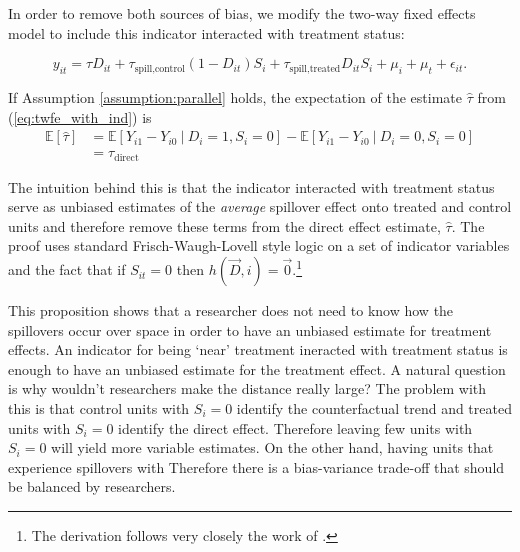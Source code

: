 \documentclass[11pt]{article}
\begin{document}
In order to remove both sources of bias, we modify the two-way fixed effects model to include this indicator interacted with treatment status:

\begin{equation}\label{eq:twfe_with_ind}    
    y_{it} = \tau D_{it} + \tau_{\text{spill,control}} (1-D_{it}) S_{i} + \tau_{\text{spill,treated}} D_{it} S_{i} +  \mu_i + \mu_t + \epsilon_{it}.
\end{equation}

\begin{proposition}\label{thm:remove_bias}
    If Assumption \ref{assumption:parallel} holds, the expectation of the estimate $\hat{\tau}$ from (\ref{eq:twfe_with_ind}) is
    \begin{align*}
        \mathbb{E}[\hat{\tau}] &= \mathbb{E}\left[ Y_{i1} - Y_{i0} \ \vert \ D_i = 1, S_{i} = 0 \right] - \mathbb{E}\left[ Y_{i1} - Y_{i0} \ \vert \ D_i = 0, S_{i} = 0 \right] \\ 
        &= \tau_{\text{direct}} 
    \end{align*}
\end{proposition}

The intuition behind this is that the indicator interacted with treatment status serve as unbiased estimates of the \textit{average} spillover effect onto treated and control units and therefore remove these terms from the direct effect estimate, $\hat{\tau}$. The proof uses standard Frisch-Waugh-Lovell style logic on a set of indicator variables and the fact that if $S_{it} = 0$ then $h(\vec{D}, i) = \vec{0}$.\footnote{The derivation follows very closely the work of \citet{Clarke_2019}.}

This proposition shows that a researcher does not need to know how the spillovers occur over space in order to have an unbiased estimate for treatment effects. An indicator for being `near' treatment ineracted with treatment status is enough to have an unbiased estimate for the treatment effect. A natural question is why wouldn't researchers make the distance really large? The problem with this is that control units with $S_i = 0$ identify the counterfactual trend and treated units with $S_i = 0$ identify the direct effect. Therefore leaving few units with $S_i = 0$ will yield more variable estimates. On the other hand, having units that experience spillovers with Therefore there is a bias-variance trade-off that should be balanced by researchers.


\end{document}
